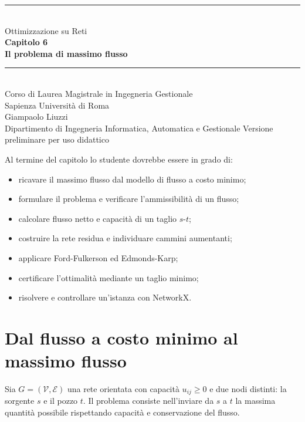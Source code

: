 \documentclass[11pt,a4paper]{article}
\newcommand{\V}{\mathcal{V}}
\newcommand{\E}{\mathcal{E}}
\begin{document}
\hypersetup{pageanchor=false}
\begin{titlepage}
\centering\vspace*{1.6cm}
{\color{sapienzared}\rule{\textwidth}{1.2pt}}\\[1.1cm]
{\Large Ottimizzazione su Reti}\\[0.35cm]
{\huge\bfseries Capitolo 6}\\[0.45cm]
{\LARGE\bfseries Il problema di massimo flusso}\\[1.1cm]
{\color{sapienzared}\rule{0.72\textwidth}{0.8pt}}\\[1.1cm]
{\large Corso di Laurea Magistrale in Ingegneria Gestionale}\\[0.25cm]
{\large Sapienza Università di Roma}\\[1.2cm]
{\large Giampaolo Liuzzi}\\[0.25cm]
{\normalsize Dipartimento di Ingegneria Informatica, Automatica e Gestionale}
\vfill{\small Versione preliminare per uso didattico}
\end{titlepage}
\hypersetup{pageanchor=true}
\tableofcontents\newpage{}

\begin{learningbox}
Al termine del capitolo lo studente dovrebbe essere in grado di:
\begin{itemize}[nosep]
\item ricavare il massimo flusso dal modello di flusso a costo minimo;
\item formulare il problema e verificare l'ammissibilità di un flusso;
\item calcolare flusso netto e capacità di un taglio $s$-$t$;
\item costruire la rete residua e individuare cammini aumentanti;
\item applicare Ford-Fulkerson ed Edmonds-Karp;
\item certificare l'ottimalità mediante un taglio minimo;
\item risolvere e controllare un'istanza con NetworkX.
\end{itemize}
\end{learningbox}

\section{Dal flusso a costo minimo al massimo flusso}

Sia $G=(\V,\E)$ una rete orientata con capacità $u_{ij}\geq0$ e due nodi distinti: la sorgente $s$ e il pozzo $t$. Il problema consiste nell'inviare da $s$ a $t$ la massima quantità possibile rispettando capacità e conservazione del flusso.
\end{document}
